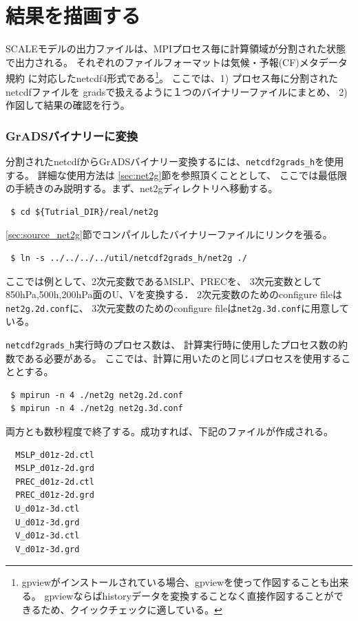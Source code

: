 \section{結果を描画する}
\label{sec:quicklook}

SCALEモデルの出力ファイルは、MPIプロセス毎に計算領域が分割された状態で出力される。
それぞれのファイルフォーマットは気候・予報(CF)メタデータ規約
に対応したnetcdf4形式である\footnote{gpviewがインストールされている場合、gpviewを使って作図することも出来る。
gpviewならばhistoryデータを変換することなく直接作図することができるため、クイックチェックに適している。}。
ここでは、1) プロセス毎に分割されたnetcdfファイルを
gradsで扱えるように１つのバイナリーファイルにまとめ、
2) 作図して結果の確認を行う。

\subsubsection{GrADSバイナリーに変換}
分割されたnetcdfからGrADSバイナリー変換するには、\verb|netcdf2grads_h|を使用する。
詳細な使用方法は \ref{sec:net2g}節を参照頂くこととして、
ここでは最低限の手続きのみ説明する。まず、net2gディレクトリへ移動する。
\begin{verbatim}
 $ cd ${Tutrial_DIR}/real/net2g
\end{verbatim}

\ref{sec:source_net2g}節でコンパイルしたバイナリーファイルにリンクを張る。
\begin{verbatim}
 $ ln -s ../../../../util/netcdf2grads_h/net2g ./
\end{verbatim}
ここでは例として、2次元変数であるMSLP、PRECを、
3次元変数として850hPa,500h,200hPa面のU、Vを変換する．
2次元変数のためのconfigure fileは\verb|net2g.2d.conf|に、
3次元変数のためのconfigure fileは\verb|net2g.3d.conf|に用意している。

\verb|netcdf2grads_h|実行時のプロセス数は、
計算実行時に使用したプロセス数の約数である必要がある。
ここでは、計算に用いたのと同じ4プロセスを使用することとする。
\begin{verbatim}
 $ mpirun -n 4 ./net2g net2g.2d.conf
 $ mpirun -n 4 ./net2g net2g.3d.conf
\end{verbatim}
両方とも数秒程度で終了する。成功すれば、下記のファイルが作成される。
\begin{verbatim}
  MSLP_d01z-2d.ctl
  MSLP_d01z-2d.grd
  PREC_d01z-2d.ctl
  PREC_d01z-2d.grd
  U_d01z-3d.ctl
  U_d01z-3d.grd
  V_d01z-3d.ctl
  V_d01z-3d.grd
\end{verbatim}


